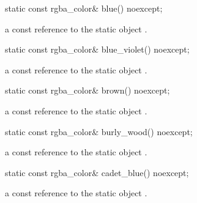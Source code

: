 \begin{itemdecl}
    static const rgba_color& blue() noexcept;
\end{itemdecl}
\begin{itemdescr}
    \pnum
    \returns
    a const reference to the static  object .
\end{itemdescr}

\begin{itemdecl}
    static const rgba_color& blue_violet() noexcept;
\end{itemdecl}
\begin{itemdescr}
    \pnum
    \returns
    a const reference to the static  object .
\end{itemdescr}

\begin{itemdecl}
    static const rgba_color& brown() noexcept;
\end{itemdecl}
\begin{itemdescr}
    \pnum
    \returns
    a const reference to the static  object .
\end{itemdescr}

\begin{itemdecl}
    static const rgba_color& burly_wood() noexcept;
\end{itemdecl}
\begin{itemdescr}
    \pnum
    \returns
    a const reference to the static  object .
\end{itemdescr}

\begin{itemdecl}
    static const rgba_color& cadet_blue() noexcept;
\end{itemdecl}
\begin{itemdescr}
    \pnum
    \returns
    a const reference to the static  object .
\end{itemdescr}

